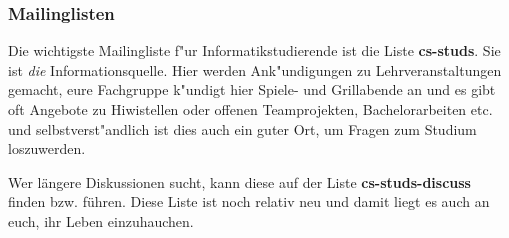 
\subsubsection*{Mailinglisten}

Die wichtigste Mailingliste f"ur Informatikstudierende ist die Liste
\textbf{cs-studs}. Sie ist \emph{die} Informationsquelle.
Hier werden Ank"undigungen zu Lehrveranstaltungen gemacht, eure
Fachgruppe k"undigt hier Spiele- und Grillabende an und es gibt
oft Angebote zu Hiwistellen oder offenen Teamprojekten,
Bachelorarbeiten etc. und selbstverst"andlich ist dies auch ein
guter Ort, um Fragen zum Studium loszuwerden.

Wer längere Diskussionen sucht, kann diese auf der Liste \textbf{cs-studs-discuss} 
finden bzw. führen. Diese Liste ist noch relativ neu und damit liegt es auch an euch, ihr Leben einzuhauchen.


